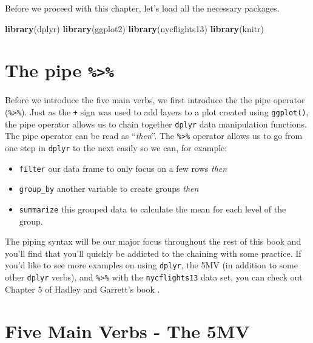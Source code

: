 \documentclass[]{tufte-book}
\newenvironment{Shaded}{\begin{snugshade}}{\end{snugshade}}
\newcommand{\KeywordTok}[1]{\textcolor[rgb]{0.13,0.29,0.53}{\textbf{{#1}}}}
\newcommand{\NormalTok}[1]{{#1}}
\providecommand{\tightlist}{%
  \setlength{\itemsep}{0pt}\setlength{\parskip}{0pt}}
\begin{document}
Before we proceed with this chapter, let's load all the necessary
packages.

\begin{Shaded}
\begin{Highlighting}[]
\KeywordTok{library}\NormalTok{(dplyr)}
\KeywordTok{library}\NormalTok{(ggplot2)}
\KeywordTok{library}\NormalTok{(nycflights13)}
\KeywordTok{library}\NormalTok{(knitr)}
\end{Highlighting}
\end{Shaded}

\section{\texorpdfstring{The pipe
\texttt{\%\textgreater{}\%}}{The pipe \%\textgreater{}\%}}\label{the-pipe}

Before we introduce the five main verbs, we first introduce the the pipe
operator (\texttt{\%\textgreater{}\%}). Just as the \texttt{+} sign was
used to add layers to a plot created using \texttt{ggplot()}, the pipe
operator allows us to chain together \texttt{dplyr} data manipulation
functions. The pipe operator can be read as ``\emph{then}''. The
\texttt{\%\textgreater{}\%} operator allows us to go from one step in
\texttt{dplyr} to the next easily so we can, for example:

\begin{itemize}
\tightlist
\item
  \texttt{filter} our data frame to only focus on a few rows \emph{then}
\item
  \texttt{group\_by} another variable to create groups \emph{then}
\item
  \texttt{summarize} this grouped data to calculate the mean for each
  level of the group.
\end{itemize}

The piping syntax will be our major focus throughout the rest of this
book and you'll find that you'll quickly be addicted to the chaining
with some practice. If you'd like to see more examples on using
\texttt{dplyr}, the 5MV (in addition to some other \texttt{dplyr}
verbs), and \texttt{\%\textgreater{}\%} with the \texttt{nycflights13}
data set, you can check out Chapter 5 of Hadley and Garrett's book
\citep{rds2016}.

\section{Five Main Verbs - The 5MV}\label{five-main-verbs---the-5mv}
\end{document}
